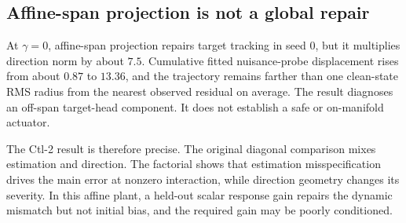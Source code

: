 \subsection{Affine-span projection is not a global repair}

At $\gamma=0$, affine-span projection repairs target tracking in seed 0, but
it multiplies direction norm by about $7.5$. Cumulative fitted nuisance-probe
displacement rises from about $0.87$ to $13.36$, and the trajectory remains
farther than one clean-state RMS radius from the nearest observed residual on
average. The result diagnoses an off-span target-head component. It does not
establish a safe or on-manifold actuator.

The Ctl-2 result is therefore precise. The original diagonal comparison mixes
estimation and direction. The factorial shows that estimation misspecification
drives the main error at nonzero interaction, while direction geometry changes
its severity. In this affine plant, a held-out scalar response gain repairs the
dynamic mismatch but not initial bias, and the required gain may be poorly
conditioned.
